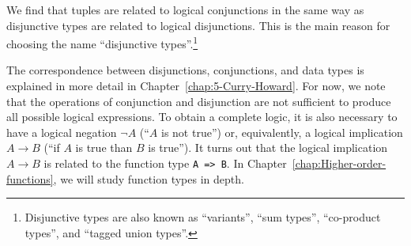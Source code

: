 We find that tuples are related to logical conjunctions in the same
way as disjunctive types are related to logical disjunctions. This
is the main reason for choosing the name ``disjunctive types''.\footnote{Disjunctive types are also known as ``variants'', ``sum types'',
``co-product types'', and ``tagged union types''.}

The correspondence between disjunctions, conjunctions, and data types
is explained in more detail in Chapter~\ref{chap:5-Curry-Howard}.
For now, we note that the operations of conjunction and disjunction
are not sufficient to produce all possible logical expressions. To
obtain a complete logic, it is also necessary to have a logical negation
$\neg A$ (``$A$ is not true'') or, equivalently, a logical implication
$A\rightarrow B$ (``if $A$ is true than $B$ is true''). It turns
out that the logical implication $A\rightarrow B$ is related to the
function type \lstinline!A => B!. In Chapter~\ref{chap:Higher-order-functions},
we will study function types in depth.
